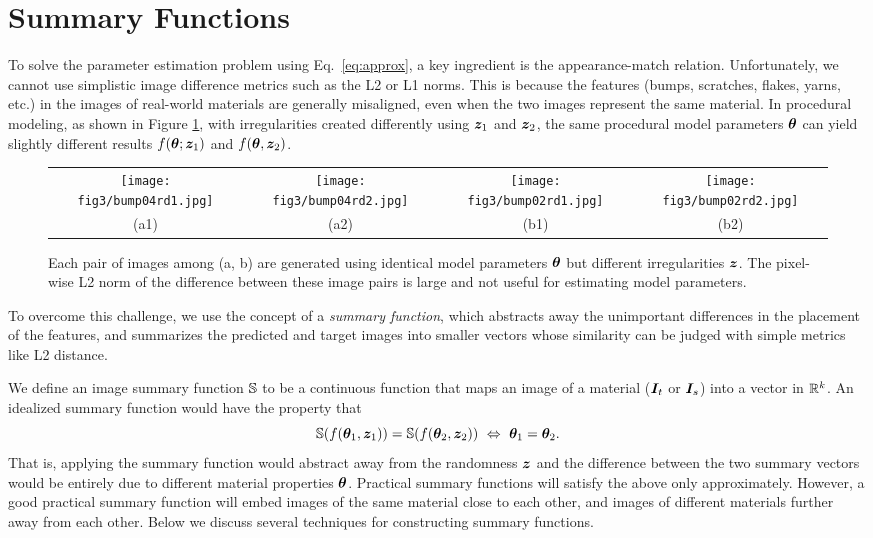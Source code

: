 \section{Summary Functions}
\label{sec:summary_func}

To solve the parameter estimation problem using Eq.~\eqref{eq:approx}, a key ingredient is the appearance-match relation.
Unfortunately, we cannot use simplistic image difference metrics such as the L2 or L1 norms.
This is because the features (bumps, scratches, flakes, yarns, etc.) in the images of real-world materials are generally misaligned, even when the two images represent the same material.
In procedural modeling, as shown in Figure \ref{fig:syn1}, with irregularities created differently using $\bm{z}_1$ and $\bm{z}_2$, the same procedural model parameters $\bm{\theta}$ can yield slightly different results $f(\bm{\theta}; \bm{z}_1)$ and $f(\bm{\theta}, \bm{z}_2)$.

\begin{figure}[t]
	\addtolength{\tabcolsep}{-5pt}
	\begin{tabular}{cccc}
		\texttt{[image: fig3/bump04rd1.jpg]} &
		\texttt{[image: fig3/bump04rd2.jpg]} &
		\texttt{[image: fig3/bump02rd1.jpg]} &
		\texttt{[image: fig3/bump02rd2.jpg]} \\
		(a1) & (a2) & (b1) & (b2)
	\end{tabular}
	\captionsetup{labelfont=bf,textfont=it}
	\caption{\label{fig:syn1}
		Each pair of images among (a, b) are generated using identical model parameters $\bm{\theta}$ but different irregularities $\bm{z}$. The pixel-wise L2 norm of the difference between these image pairs is large and not useful for estimating model parameters.
	}
\end{figure}

To overcome this challenge, we use the concept of a \emph{summary function}, which abstracts away the unimportant differences in the placement of the features, and summarizes the predicted and target images into smaller vectors whose similarity can be judged with simple metrics like L2 distance.

We define an image summary function $\mathbb{S}$ to be a continuous function that maps an image of a material ($\bm{I}_t$ or $\bm{I}_s$) into a vector in $\mathbb{R}^k$. An idealized summary function would have the property that
%
\begin{equation}
	\mathbb{S}(f(\bm{\theta}_1, \bm{z}_1)) = \mathbb{S}(f(\bm{\theta}_2, \bm{z}_2)) \ \Leftrightarrow \ \bm{\theta}_1 = \bm{\theta}_2.
\end{equation}
%
That is, applying the summary function would %
abstract away from the randomness $\bm{z}$ and the difference between the two summary vectors would be entirely due to different material properties $\bm{\theta}$. Practical summary functions will satisfy the above only approximately. However, a good practical summary function will embed images of the same material close to each other, and images of different materials further away from each other. Below we discuss several techniques for constructing summary functions.


